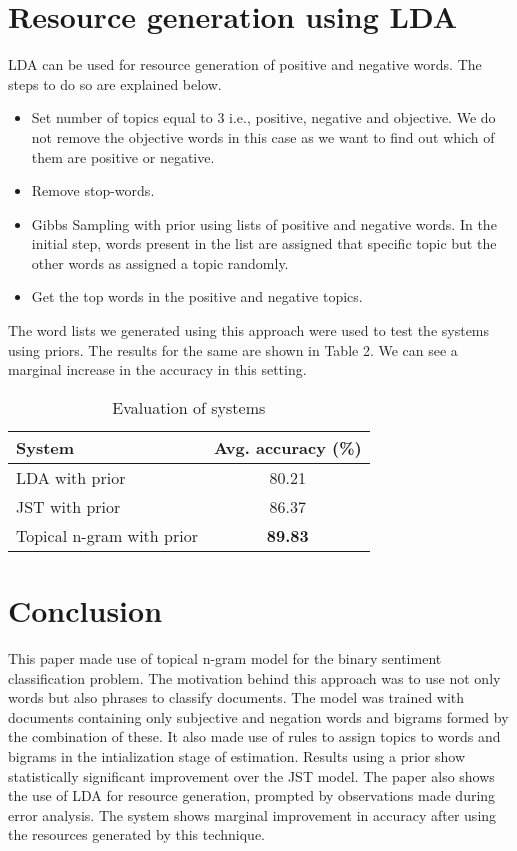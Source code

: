 \documentclass[11pt]{article}
\begin{document}
\section{Resource generation using LDA}\label{resource}

LDA can be used for resource generation of positive and negative words. The steps to do so are explained below.

\begin{itemize}
 \itemsep0em
 \item Set number of topics equal to 3 i.e., positive, negative and objective. We do not remove the objective
 words in this case as we want to find out which of them are positive or negative.
 \item Remove stop-words.
 \item Gibbs Sampling with prior using lists of positive and negative words. In the initial step, words present 
 in the list are assigned that specific topic but the other words as assigned a topic randomly.
 \item Get the top words in the positive and negative topics.
\end{itemize}

The word lists we generated using this approach were used to test the systems using priors. The results for the same
are shown in Table 2. We can see a marginal increase in the accuracy in this setting.

\begin{table}[h]
\begin{center}
\begin{tabular}{|l|c|}
\hline \bf System & \bf Avg. accuracy (\%)\\ \hline
LDA with prior & 80.21\\
JST with prior & 86.37\\
Topical n-gram with prior & \textbf{89.83}\\
\hline
\end{tabular}
\end{center}
\caption{\label{result-table} Evaluation of systems}
\end{table}

\section{Conclusion}\label{conclusion}

This paper made use of topical n-gram model for the binary sentiment classification problem. The motivation behind this
approach was to use not only words but also phrases to classify documents. The model was trained with documents containing
only subjective and negation words and bigrams formed by the combination of these. It also made use of rules to 
assign topics to words and bigrams in the intialization stage of estimation. Results using a prior show statistically 
significant improvement over the JST model. The paper also shows the use of LDA for resource generation, prompted by 
observations made during error analysis. The system shows marginal improvement in accuracy after using the resources
generated by this technique.
\end{document}
